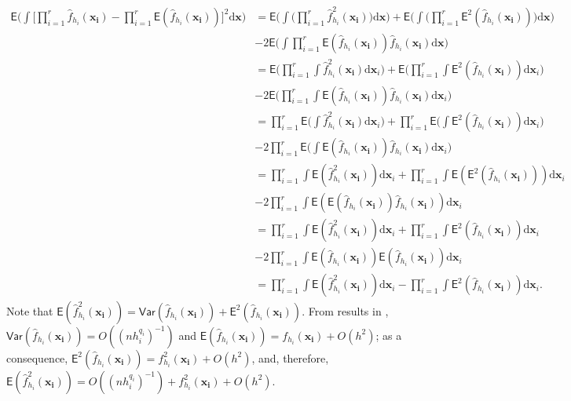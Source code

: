 \documentclass{article}
\begin{document}
\begin{align}
    \mathsf{E} \Bigg( \int \Big[ \prod_{i = 1}^{r} \hat{f}_{h_i}(\mathbf{x_i}) - \prod_{i = 1}^{r} \mathsf{E} (\hat{f}_{h_i} (\mathbf{x_i})) \Big]^2 \mathrm{d} \mathbf{x} \Bigg) &= \mathsf{E} \Bigg( \int  \Bigg( \prod_{i = 1}^{r} \hat{f}_{h_i}^2(\mathbf{x_i}) \Bigg) \mathrm{d} \mathbf{x} \Bigg)  + \mathsf{E} \Bigg( \int \Bigg( \prod_{i = 1}^{r} \mathsf{E}^2 (\hat{f}_{h_i} (\mathbf{x_i})) \Bigg) \mathrm{d} \mathbf{x} \Bigg) \\
    &- 2 \mathsf{E} \Bigg( \int \prod_{i = 1}^{r} \mathsf{E} (\hat{f}_{h_i} (\mathbf{x_i})) \hat{f}_{h_i} (\mathbf{x_i}) \mathrm{d} \mathbf{x} \Bigg) \\
    &= \mathsf{E} \Bigg( \prod_{i = 1}^{r} \int  \hat{f}_{h_i}^2(\mathbf{x_i}) \mathrm{d} \mathbf{x}_i \Bigg)  + \mathsf{E} \Bigg( \prod_{i = 1}^{r} \int \mathsf{E}^2 (\hat{f}_{h_i} (\mathbf{x_i})) \mathrm{d} \mathbf{x}_i \Bigg) \\
    &- 2 \mathsf{E} \Bigg( \prod_{i = 1}^{r} \int \mathsf{E} (\hat{f}_{h_i} (\mathbf{x_i})) \hat{f}_{h_i} (\mathbf{x_i}) \mathrm{d} \mathbf{x}_i \Bigg) \\
    &= \prod_{i = 1}^{r} \mathsf{E} \Bigg( \int  \hat{f}_{h_i}^2(\mathbf{x_i}) \mathrm{d} \mathbf{x}_i \Bigg)  + \prod_{i = 1}^{r} \mathsf{E} \Bigg( \int \mathsf{E}^2 (\hat{f}_{h_i} (\mathbf{x_i})) \mathrm{d} \mathbf{x}_i \Bigg) \\
     &- 2 \prod_{i = 1}^{r} \mathsf{E} \Bigg( \int \mathsf{E} (\hat{f}_{h_i} (\mathbf{x_i})) \hat{f}_{h_i} (\mathbf{x_i}) \mathrm{d} \mathbf{x}_i \Bigg) \\
     &= \prod_{i = 1}^{r} \int \mathsf{E} (  \hat{f}_{h_i}^2(\mathbf{x_i}) ) \mathrm{d} \mathbf{x}_i  + \prod_{i = 1}^{r} \int \mathsf{E} ( \mathsf{E}^2 (\hat{f}_{h_i} (\mathbf{x_i})) ) \mathrm{d} \mathbf{x}_i \\
     &- 2 \prod_{i = 1}^{r} \int \mathsf{E} ( \mathsf{E} (\hat{f}_{h_i} (\mathbf{x_i})) \hat{f}_{h_i} (\mathbf{x_i}) ) \mathrm{d} \mathbf{x}_i \\
     &= \prod_{i = 1}^{r} \int \mathsf{E} (  \hat{f}_{h_i}^2(\mathbf{x_i}) ) \mathrm{d} \mathbf{x}_i  + \prod_{i = 1}^{r} \int \mathsf{E}^2 (\hat{f}_{h_i} (\mathbf{x_i})) \mathrm{d} \mathbf{x}_i \\
     &- 2 \prod_{i = 1}^{r} \int \mathsf{E} (\hat{f}_{h_i} (\mathbf{x_i})) \mathsf{E} (\hat{f}_{h_i} (\mathbf{x_i}) ) \mathrm{d} \mathbf{x}_i \\
     &= \prod_{i = 1}^{r} \int \mathsf{E} (  \hat{f}_{h_i}^2(\mathbf{x_i}) ) \mathrm{d} \mathbf{x}_i  - \prod_{i = 1}^{r} \int \mathsf{E}^2 (\hat{f}_{h_i} (\mathbf{x_i})) \mathrm{d} \mathbf{x}_i.
\end{align}
Note that $\mathsf{E} (  \hat{f}_{h_i}^2(\mathbf{x_i}) ) = \mathsf{Var} (  \hat{f}_{h_i}(\mathbf{x_i}) ) + \mathsf{E}^2 (\hat{f}_{h_i} (\mathbf{x_i}))$. From results in \cite{Garc_a_Portugu_s_2013}, $\mathsf{Var} (  \hat{f}_{h_i}(\mathbf{x_i}) ) = O((nh_i^{q_i})^{-1})$ and $ \mathsf{E} (\hat{f}_{h_i} (\mathbf{x_i})) = f_{h_i} (\mathbf{x_i}) + O(h^2)$; as a consequence, $\mathsf{E}^2 (\hat{f}_{h_i} (\mathbf{x_i})) = f_{h_i}^2 (\mathbf{x_i}) + O(h^2)$, and, therefore, $\mathsf{E} (  \hat{f}_{h_i}^2(\mathbf{x_i}) ) = O((nh_i^{q_i})^{-1}) + f_{h_i}^2 (\mathbf{x_i}) + O(h^2)$.
\end{document}

